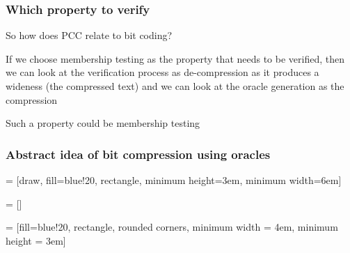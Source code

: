\documentclass[slidestop,compress,mathserif, xcolor=table]{beamer}
\begin{document}
\begin{frame}
  \frametitle{Which property to verify}
  
  So how does PCC relate to bit coding?

  If we choose membership testing as the property that needs to be verified,
  then we can look at the verification process as de-compression as it produces a
  wideness (the compressed text) and we can look at the oracle generation as the
  compression 
  
  Such a property could be membership testing
  
\end{frame}

\begin{frame}
  \frametitle{Abstract idea of bit compression using oracles}

   = [draw, fill=blue!20, rectangle, minimum height=3em,
  minimum width=6em]
  
   = []

   = [fill=blue!20, rectangle, rounded corners,
  minimum width = 4em, minimum height = 3em]
  
  \begin{figure}[ht]
    \centering
    

\end{figure}
\end{frame}
\end{document}
